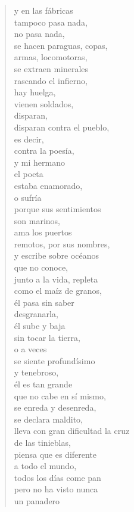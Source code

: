 \documentclass[12pt]{article}
\begin{document}
\begin{verse}
{y en las fábricas\\
tampoco pasa nada,\\
no pasa nada,\\
se hacen paraguas, copas,\\
armas, locomotoras,\\
se extraen minerales\\
rascando el infierno,\\
hay huelga,\\
vienen soldados,\\
disparan,\\
disparan contra el pueblo,\\
es decir,\\
contra la poesía,\\
y mi hermano\\
el poeta\\
estaba enamorado,\\
o sufría\\
porque sus sentimientos\\
son marinos,\\
ama los puertos\\
remotos, por sus nombres,\\
y escribe sobre océanos\\
que no conoce,\\
junto a la vida, repleta\\
como el maíz de granos,\\
él pasa sin saber\\
desgranarla,\\
él sube y baja\\
sin tocar la tierra,\\
o a veces\\
se siente profundísimo\\
y tenebroso,\\
él es tan grande\\
que no cabe en sí mismo,\\
se enreda y desenreda,\\
se declara maldito,\\
lleva con gran dificultad la cruz\\
de las tinieblas,\\
piensa que es diferente\\
a todo el mundo,\\
todos los días come pan\\
pero no ha visto nunca\\
un panadero\\
}
\end{verse}
\end{document}
